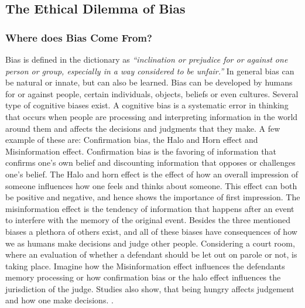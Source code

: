 \documentclass[11pt, fleqn, titlepage]{article}
\begin{document}
	\subsection{The Ethical Dilemma of Bias}\label{ethical_dilemma_of_bias}
	
	\subsubsection{Where does Bias Come From?}\label{rootofbias}
	Bias is defined in the dictionary as \textit{\enquote{inclination or prejudice for or against one person or group, especially in a way considered to be unfair.}} In general bias can be natural or innate,  but can also be learned. Bias can be developed by humans for or against people, certain individuals, objects, beliefs or even cultures. Several type of cognitive biases exist. A cognitive bias is a systematic error in thinking that occurs when people are processing and interpreting information in the world around them and affects the decisions and judgments that they make. \cite{verywellmind} A few example of these are: Confirmation bias, the Halo and Horn effect and Misinformation effect. Confirmation bias is the favoring of information that confirms one's own belief and discounting information that opposes or challenges one's belief. The Halo and horn effect is the effect of how an overall impression of someone influences how one feels and thinks about someone. This effect can both be positive and negative, and hence shows the importance of first impression. The misinformation effect is the tendency of information that happens after an event to interfere with the memory of the original event. Besides the three mentioned biases a plethora of others exist, and all of these biases have consequences of how we as humans make decisions and judge other people. Considering a court room, where an evaluation of whether a defendant should be let out on parole or not, is taking place. Imagine how the Misinformation effect influences the defendants memory processing or how confirmation bias or the halo effect influences the jurisdiction of the judge. Studies also show, that being hungry affects judgement  and how one make decisions. \cite{eat}. \newline \indent
\end{document}
